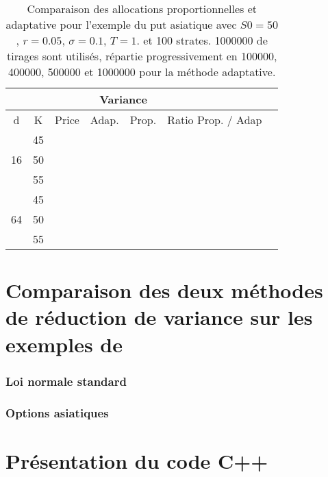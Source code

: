 \documentclass[12pt,a4paper]{report}
\begin{document}
\begin{table}[H]
\centering
	\begin{tabular*}{\textwidth}{@{\extracolsep{\fill}}ccccccc}
		\hline
			                &   &   & \multicolumn{2}{|c|}{Variance} &                      \\ 
		\hline
		
		d	                & K  & Price  & Adap.    & Prop.    & Ratio Prop. / Adap        \\
		\hline
		\multirow{3}{*}{16} & 45 &    &  &  & 	                    \\
							& 50 &    &  &  & 	                    \\
							& 55 &    &  &  & 	                    \\
		\hline
		\multirow{3}{*}{64} & 45 &    &  &  & 	                    \\
							& 50 &    &  &  &                       \\
							& 55 &    &  &  & 	                \\
		\hline
	\end{tabular*}
\caption{Comparaison des allocations proportionnelles et adaptative pour l'exemple du put asiatique avec $S0 = 50$, $r = 0.05$, $\sigma = 0.1$, $T = 1.$ et 100 strates. 1000000 de tirages sont utilisés, répartie progressivement en 100000, 400000, 500000 et 1000000 pour la méthode adaptative.}
\label{tab:strat_asian_put}
\end{table}


\chapter{Comparaison des deux méthodes de réduction de variance sur les exemples de \cite{EJ08}}

\subsection{Loi normale standard}

\subsection{Options asiatiques}


\chapter{Présentation du code C++}


{}

\end{document}
